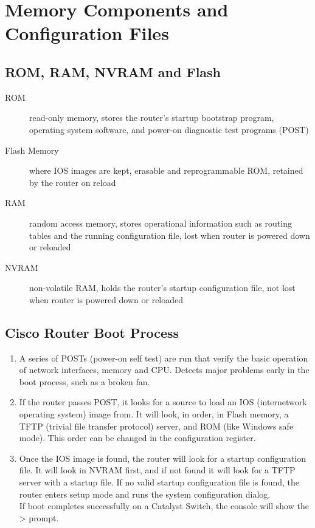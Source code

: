 \section{Memory Components and Configuration Files}

\subsection{ROM, RAM, NVRAM and Flash}

\begin{description}

\item[ROM]
read-only memory, stores the router's startup bootstrap program, operating
system software, and power-on diagnostic test programs (POST)

\item[Flash Memory]
where IOS images are kept, erasable and reprogrammable ROM, retained by the
router on reload

\item[RAM]
random access memory, stores operational information such as routing tables
and the running configuration file, lost when router is powered down or
reloaded

\item[NVRAM]
non-volatile RAM, holds the router's startup configuration file, not lost
when router is powered down or reloaded
\end{description}

\subsection{Cisco Router Boot Process}

\begin{enumerate}

\item A series of POSTs (power-on self test) are run that verify the basic
operation of network interfaces, memory and CPU. Detects major problems early
in the boot process, such as a broken fan.

\item If the router passes POST, it looks for a source to load an IOS
(internetwork operating system) image from. It will look, in order, in
Flash memory, a TFTP (trivial file transfer protocol) server, and ROM (like
Windows safe mode). This order can be changed in the configuration register.

\item Once the IOS image is found, the router will look for a startup
configuration file. It will look in NVRAM first, and if not found it will
look for a TFTP server with a startup file. If no valid startup
configuration file is found, the router enters setup mode and runs the
system configuration dialog.\\

If boot completes successfully on a Catalyst Switch, the console will show
the > prompt.

\end{enumerate}

